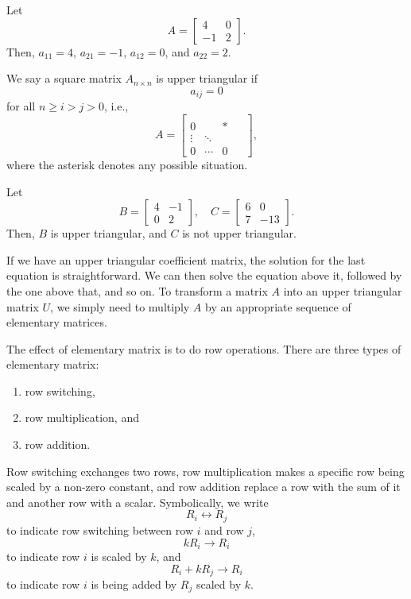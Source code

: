 \documentclass[11pt]{article}
\theoremstyle{break}
\theoremstyle{no_label}
\numberwithin{equation}{theorem}
\begin{document}
\begin{example}
    Let $$A=\begin{bmatrix}
        4 & 0 \\ -1 & 2
    \end{bmatrix}.$$ Then, $a_{11}=4$, $a_{21}=-1$, $a_{12}=0$, and $a_{22}=2$.
\end{example}

\begin{definition}
    We say a square matrix $A_{n\times n}$ is upper triangular if
    \begin{equation*}
        a_{ij}=0
    \end{equation*}
    for all $n\ge i>j>0$, i.e., \begin{equation*}
        A=\begin{bmatrix}
            & & &\\
           0 & & \ast &\\
           \vdots  & \ddots &  \\
           0 & \cdots & 0 & \ \ 
        \end{bmatrix},
    \end{equation*}
    where the asterisk denotes any possible situation.
\end{definition}

\begin{example}
    Let $$B=\begin{bmatrix}
        4 & -1 \\ 0 & 2
    \end{bmatrix},\quad C=\begin{bmatrix}
        6 & 0 \\ 7 & -13
    \end{bmatrix}.$$ Then, $B$ is upper triangular, and $C$
    is not upper triangular.
\end{example}

If we have an upper triangular coefficient matrix, the solution for the last equation is straightforward. We can then solve the equation above it, followed by the one above that, and so on. To transform a matrix $A$ into an upper triangular matrix $U$, we simply need to multiply $A$ by an appropriate sequence of elementary matrices.

\begin{definition}
    The effect of elementary matrix is to do row operations. There are three types of elementary matrix: \begin{enumerate}
        \item row switching,
        \item row multiplication, and
        \item row addition.
    \end{enumerate}
    Row switching exchanges two rows, row multiplication makes a specific row being scaled by a non-zero constant, and row addition replace a row with the sum of it and another row with a scalar. Symbolically, we write $$R_i\leftrightarrow R_j$$ to indicate row switching between row $i$ and row $j$, $$kR_i\to R_i$$ to indicate row $i$ is scaled by $k$, and $$R_i+kR_j\to R_i$$ to indicate row $i$ is being added by $R_j$ scaled by $k$.
\end{definition}
\end{document}
